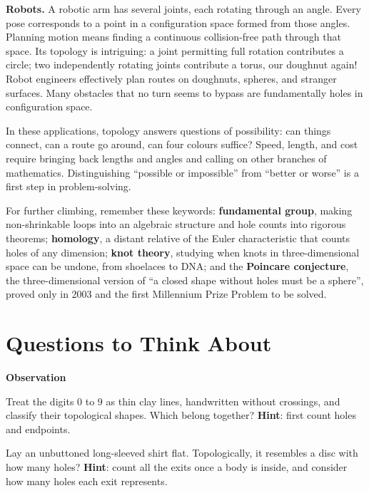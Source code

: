 \textbf{Robots.} A robotic arm has several joints, each rotating through an angle. Every pose corresponds to a point in a configuration space formed from those angles. Planning motion means finding a continuous collision-free path through that space. Its topology is intriguing: a joint permitting full rotation contributes a circle; two independently rotating joints contribute a torus, our doughnut again! Robot engineers effectively plan routes on doughnuts, spheres, and stranger surfaces. Many obstacles that no turn seems to bypass are fundamentally holes in configuration space.

\begin{zhu}
In these applications, topology answers questions of possibility: can things connect, can a route go around, can four colours suffice? Speed, length, and cost require bringing back lengths and angles and calling on other branches of mathematics. Distinguishing ``possible or impossible'' from ``better or worse'' is a first step in problem-solving.
\end{zhu}

\begin{pandeng}
For further climbing, remember these keywords: \textbf{fundamental group}, making non-shrinkable loops into an algebraic structure and hole counts into rigorous theorems; \textbf{homology}, a distant relative of the Euler characteristic that counts holes of any dimension; \textbf{knot theory}, studying when knots in three-dimensional space can be undone, from shoelaces to DNA; and the \textbf{Poincare conjecture}, the three-dimensional version of ``a closed shape without holes must be a sphere'', proved only in 2003 and the first Millennium Prize Problem to be solved.
\end{pandeng}

\section*{Questions to Think About}

\textbf{Observation}

\begin{sikao}
  \item Treat the digits $0$ to $9$ as thin clay lines, handwritten without crossings, and classify their topological shapes. Which belong together? \textbf{Hint}: first count holes and endpoints.
  \item Lay an unbuttoned long-sleeved shirt flat. Topologically, it resembles a disc with how many holes? \textbf{Hint}: count all the exits once a body is inside, and consider how many holes each exit represents.
\end{sikao}

